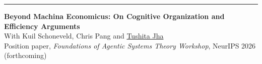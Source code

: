 \hrule %
\vspace{3mm}
\justifying
    \textbf{Beyond Machina Economicus: On Cognitive Organization and Efficiency Arguments} \\[3pt]
    With Kuil Schoneveld, Chris Pang and \href{https://scholar.google.com/citations?user=sDpnXloAAAAJ&hl=en}{Tushita Jha} \\[3pt]
    Position paper, \textit{Foundations of Agentic Systems Theory Workshop}, NeurIPS 2026 (forthcoming) \\[3pt]
